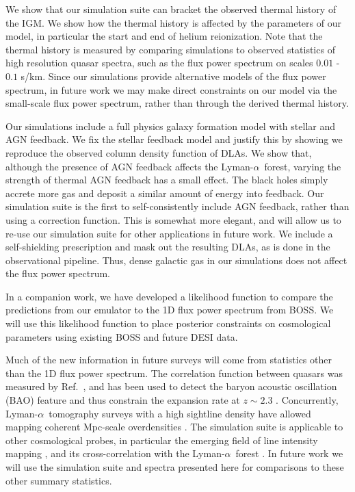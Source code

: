 \documentclass[a4paper,11pt]{article}
\newcommand{\Lya}{Lyman-$\alpha$}
\begin{document}
We show that our simulation suite can bracket the observed thermal history of the IGM. We show how the thermal history is affected by the parameters of our model, in particular the start and end of helium reionization. Note that the thermal history is measured by comparing simulations to observed statistics of high resolution quasar spectra, such as the flux power spectrum on scales $0.01$ - $0.1$ s/km. Since our simulations provide alternative models of the flux power spectrum, in future work we may make direct constraints on our model via the small-scale flux power spectrum, rather than through the derived thermal history.

Our simulations include a full physics galaxy formation model with stellar and AGN feedback. We fix the stellar feedback model and justify this by showing we reproduce the observed column density function of DLAs. We show that, although the presence of AGN feedback affects the
\Lya~forest, varying the strength of thermal AGN feedback has a small effect. The black holes simply accrete more gas and deposit a similar amount of energy into feedback. Our simulation suite is the first to self-consistently include AGN feedback, rather than using a correction function. This is somewhat more elegant, and will allow us to re-use our simulation suite for other applications in future work. We include a self-shielding prescription and mask out the resulting DLAs, as is done in the observational pipeline. Thus, dense galactic gas in our simulations does not affect the flux power spectrum.

In a companion work, we have developed a likelihood function to compare the predictions from our emulator to the 1D flux power spectrum from BOSS. We will use this likelihood function to place posterior constraints on cosmological parameters using existing BOSS and future DESI data.

Much of the new information in future surveys will come from statistics other than the 1D flux power spectrum. The correlation function between quasars was measured by Ref.~\cite{Slosar:2011}, and has been used to detect the baryon acoustic oscillation (BAO) feature and thus constrain the expansion rate at $z\sim 2.3$ \cite{dSAgathe:2019, Cuceu:2022}. Concurrently, \Lya~tomography surveys with a high sightline density have allowed mapping coherent Mpc-scale overdensities \cite{Lee:CLAMATO, LATIS, Qezlou:2022, Horowitz:2022}. The simulation suite is applicable to other cosmological probes, in particular the emerging field of line intensity mapping \cite{Kovetz:2017}, and its cross-correlation with the \Lya~forest \cite{Qezlou:2023}. In future work we will use the simulation suite and spectra presented here for comparisons to these other summary statistics.
\end{document}
